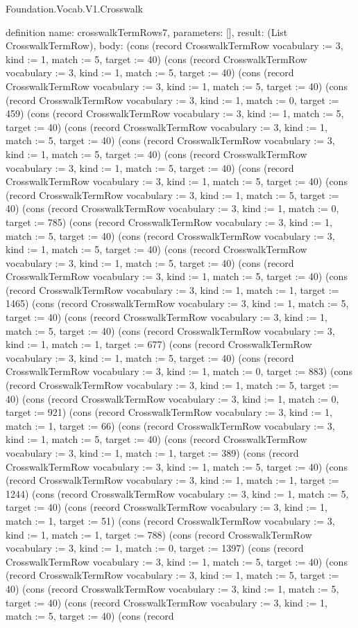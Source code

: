 \begin{lexlean}{Foundation.Vocab.V1.Crosswalk}
\begin{semanticmodule}
definition{
  name: crosswalkTermRows7,
  parameters: [],
  result: (List CrosswalkTermRow),
  body: (cons (record CrosswalkTermRow {vocabulary := 3, kind := 1, match := 5, target := 40}) (cons (record CrosswalkTermRow {vocabulary := 3, kind := 1, match := 5, target := 40}) (cons (record CrosswalkTermRow {vocabulary := 3, kind := 1, match := 5, target := 40}) (cons (record CrosswalkTermRow {vocabulary := 3, kind := 1, match := 0, target := 459}) (cons (record CrosswalkTermRow {vocabulary := 3, kind := 1, match := 5, target := 40}) (cons (record CrosswalkTermRow {vocabulary := 3, kind := 1, match := 5, target := 40}) (cons (record CrosswalkTermRow {vocabulary := 3, kind := 1, match := 5, target := 40}) (cons (record CrosswalkTermRow {vocabulary := 3, kind := 1, match := 5, target := 40}) (cons (record CrosswalkTermRow {vocabulary := 3, kind := 1, match := 5, target := 40}) (cons (record CrosswalkTermRow {vocabulary := 3, kind := 1, match := 5, target := 40}) (cons (record CrosswalkTermRow {vocabulary := 3, kind := 1, match := 0, target := 785}) (cons (record CrosswalkTermRow {vocabulary := 3, kind := 1, match := 5, target := 40}) (cons (record CrosswalkTermRow {vocabulary := 3, kind := 1, match := 5, target := 40}) (cons (record CrosswalkTermRow {vocabulary := 3, kind := 1, match := 5, target := 40}) (cons (record CrosswalkTermRow {vocabulary := 3, kind := 1, match := 5, target := 40}) (cons (record CrosswalkTermRow {vocabulary := 3, kind := 1, match := 1, target := 1465}) (cons (record CrosswalkTermRow {vocabulary := 3, kind := 1, match := 5, target := 40}) (cons (record CrosswalkTermRow {vocabulary := 3, kind := 1, match := 5, target := 40}) (cons (record CrosswalkTermRow {vocabulary := 3, kind := 1, match := 1, target := 677}) (cons (record CrosswalkTermRow {vocabulary := 3, kind := 1, match := 5, target := 40}) (cons (record CrosswalkTermRow {vocabulary := 3, kind := 1, match := 0, target := 883}) (cons (record CrosswalkTermRow {vocabulary := 3, kind := 1, match := 5, target := 40}) (cons (record CrosswalkTermRow {vocabulary := 3, kind := 1, match := 0, target := 921}) (cons (record CrosswalkTermRow {vocabulary := 3, kind := 1, match := 1, target := 66}) (cons (record CrosswalkTermRow {vocabulary := 3, kind := 1, match := 5, target := 40}) (cons (record CrosswalkTermRow {vocabulary := 3, kind := 1, match := 1, target := 389}) (cons (record CrosswalkTermRow {vocabulary := 3, kind := 1, match := 5, target := 40}) (cons (record CrosswalkTermRow {vocabulary := 3, kind := 1, match := 1, target := 1244}) (cons (record CrosswalkTermRow {vocabulary := 3, kind := 1, match := 5, target := 40}) (cons (record CrosswalkTermRow {vocabulary := 3, kind := 1, match := 1, target := 51}) (cons (record CrosswalkTermRow {vocabulary := 3, kind := 1, match := 1, target := 788}) (cons (record CrosswalkTermRow {vocabulary := 3, kind := 1, match := 0, target := 1397}) (cons (record CrosswalkTermRow {vocabulary := 3, kind := 1, match := 5, target := 40}) (cons (record CrosswalkTermRow {vocabulary := 3, kind := 1, match := 5, target := 40}) (cons (record CrosswalkTermRow {vocabulary := 3, kind := 1, match := 5, target := 40}) (cons (record CrosswalkTermRow {vocabulary := 3, kind := 1, match := 5, target := 40}) (cons (record }
\end{semanticmodule}
\end{lexlean}
